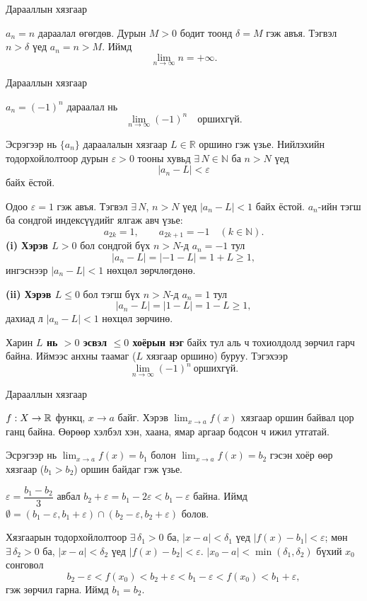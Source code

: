 \begin{frame}[allowframebreaks]{Дарааллын хязгаар}
\begin{example}
$a_n = n$ дараалал өгөгдөв.  
Дурын $M>0$ бодит тоонд $\delta=M$ гэж авъя. Тэгвэл $n>\delta$ үед $a_n=n>M$.  
Иймд
\[
\lim_{n\to\infty} n = +\infty.
\]
\end{example}
\end{frame}

\begin{frame}[allowframebreaks]{Дарааллын хязгаар}
\begin{example}
$a_n = (-1)^n$ дараалал нь 
\[
\lim_{n\to\infty} (-1)^n \quad \text{оршихгүй}.
\]
\end{example}
\begin{prof}
Эсрэгээр нь $\{a_n\}$ дараалалын хязгаар $L\in\mathbb{R}$ оршино гэж үзье. 
Нийлэхийн тодорхойлолтоор дурын $\varepsilon>0$ тооны хувьд $\exists\,N\in\mathbb{N}$ ба $n>N$ үед 
\[
|a_n-L|<\varepsilon
\]
байх ёстой.

Одоо $\varepsilon=1$ гэж авъя. Тэгвэл $\exists\,N$, $n>N$ үед $|a_n-L|<1$ байх ёстой.
 $a_n$-ийн тэгш ба сондгой индексүүдийг ялгаж авч үзье:
\[
a_{2k}=1,\qquad a_{2k+1}=-1\quad (k\in\mathbb{N}).
\]
\textbf{(i) Хэрэв $L> 0$} бол сондгой бүх $n> N$-д $a_n=-1$ тул
\[
|a_n-L|=|-1-L|=1+L\ge 1,
\]
ингэснээр $|a_n-L|<1$ нөхцөл зөрчлөгдөнө.

\textbf{(ii) Хэрэв $L\le 0$} бол тэгш бүх $n> N$-д $a_n=1$ тул
\[
|a_n-L|=|1-L|=1-L\ge 1,
\]
дахиад л $|a_n-L|<1$ нөхцөл зөрчинө.

Харин \textbf{$L$ нь $>0$ эсвэл $\le 0$ хоёрын нэг} байх тул аль ч тохиолдолд зөрчил гарч байна. 
Иймээс анхны таамаг (\(L\) хязгаар оршино) буруу. Тэгэхээр
\[
\lim_{n\to\infty}(-1)^n \ \text{оршихгүй}.
\]
\end{prof}
\end{frame}

\begin{frame}[allowframebreaks]{Дарааллын хязгаар}
\begin{theorem}\label{uniqlim}
$f:X\to\mathbb{R}$ функц, $x\to a$ байг. Хэрэв $\displaystyle\lim_{x\to a} f(x)$ хязгаар оршин байвал цор ганц байна. Өөрөөр хэлбэл хэн, хаана, ямар аргаар бодсон ч ижил утгатай.
\end{theorem}

\begin{prof}
Эсрэгээр нь $\lim_{x\to a}f(x)=b_1$ болон $\lim_{x\to a}f(x)=b_2$ гэсэн хоёр өөр хязгаар ($b_1>b_2$) оршин байдаг гэж үзье.

$\varepsilon=\dfrac{b_1-b_2}{3}$ авбал $b_2+\varepsilon=b_1-2\varepsilon<b_1-\varepsilon$ байна. Иймд $\emptyset=(b_1-\varepsilon, b_1+\varepsilon)\cap (b_2-\varepsilon,b_2+\varepsilon)$ болов.

Хязгаарын тодорхойлолтоор $\exists\,\delta_1>0$ ба, $|x-a|<\delta_1$ үед $|f(x)-b_1|<\varepsilon$; мөн $\exists\,\delta_2>0$ ба, $|x-a|<\delta_2$ үед $|f(x)-b_2|<\varepsilon$. $|x_0-a|<\min(\delta_1,\delta_2)$ бүхий $x_0$ сонговол
\[
b_2-\varepsilon<f(x_0)<b_2+\varepsilon<b_1-\varepsilon<f(x_0)<b_1+\varepsilon,
\]
гэж зөрчил гарна. Иймд $b_1=b_2$.
\end{prof}
\end{frame}

